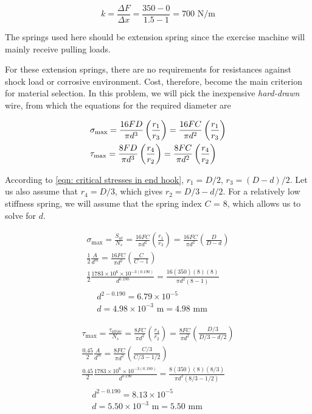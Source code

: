 \documentclass[a4paper,openany,12pt]{book}
\begin{document}
{{\begin{enumerate}
$$k = \frac{\Delta F}{\Delta x} = \frac{350 - 0}{1.5 - 1} = 700\text{ N/m}$$

The springs used here should be extension spring since the exercise
machine will mainly receive pulling loads.

For these extension springs, there are no requirements for resistances
against shock load or corrosive environment. Cost, therefore, become the
main criterion for material selection. In this problem, we will pick the
inexpensive \emph{hard-drawn} wire, from which the equations for the required
diameter are

$$\begin{gathered}
  \sigma_{\max} = \frac{16FD}{\pi d^3}\left( \frac{r_1}{r_3} \right) = \frac{16FC}{\pi d^2}\left( \frac{r_1}{r_3} \right) \hfill \\
  \tau_{\max} = \frac{8FD}{\pi d^3}\left( \frac{r_4}{r_2} \right) = \frac{8FC}{\pi d^2}\left( \frac{r_4}{r_2} \right) \hfill \\ 
\end{gathered}$$

According to
\ref{eqn: critical stresses in end hook},
\(r_1 = D / 2\), \(r_3 = (D - d) / 2\). Let us also assume that
\(r_4 = D / 3\), which gives \(r_2 = D / 3 - d / 2\). For a relatively low
stiffness spring, we will assume that the spring index \(C\) = 8, which
allows us to solve for \(d\).

$$\begin{gathered}
  \sigma_{\max} = \frac{S_{ut}}{N_s} = \frac{16FC}{\pi d^2}\left( \frac{r_1}{r_3} \right) = \frac{16FC}{\pi d^2}\left( \frac{D}{D - d} \right) \\
  \frac{1}{2}\frac{A}{d^m} = \frac{16FC}{\pi d^2}\left( \frac{C}{C - 1} \right) \\ 
  \frac{1}{2}\frac{1783 \times 10^6 \times 10^{-3(0.190)}}{d^{0.190}} = \frac{16(350)(8)(8)}{\pi d^2(8 - 1)} \\
  \begin{aligned}
  &d^{2-0.190} = 6.79 \times 10^{-5} \\ 
  &d = 4.98 \times 10^{-3} \text{ m} = 4.98\text{ mm}
  \end{aligned}\end{gathered}$$

$$\begin{gathered}
  \tau_{\max} = \frac{\tau_{allow}}{N_s} = \frac{8FC}{\pi d^2}\left( \frac{r_4}{r_2} \right) = \frac{8FC}{\pi d^2}\left( \frac{D/3}{D/3 - d/2} \right) \\ 
  \frac{0.45}{2}\frac{A}{d^m} = \frac{8FC}{\pi d^2}\left( \frac{C/3}{C/3 - 1/2} \right) \\ 
  \frac{0.45}{2}\frac{1783 \times 10^6 \times 10^{-3(0.190)}}{d^{0.190}} = \frac{8(350)(8)(8/3)}{\pi d^2(8/3 - 1/2)} \\
  \begin{aligned}
  &d^{2-0.190} = 8.13 \times 10^{-5} \\ 
  &d = 5.50 \times 10^{-3}\text{ m} = 5.50 \text{ mm}
  \end{aligned}\end{gathered}$$


\end{enumerate}}}
\end{document}
